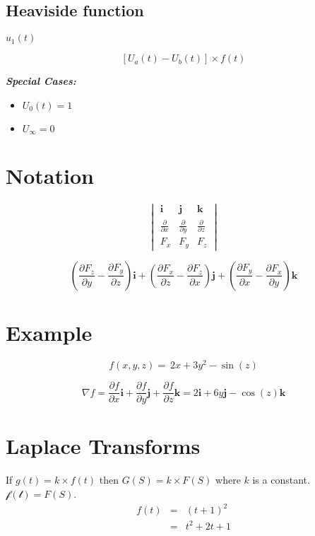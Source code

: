 \documentclass[12pt, a4paper]{article}
\begin{document}
\subsection*{Heaviside function}
$u_1(t)$


\[ \left[U_a(t)  - U_b(t) \right] \times f(t) \]

\textbf{\emph{Special Cases:}}
\begin{itemize}
\item $U_0(t) = 1$
\item $U_{\infty} = 0$
\end{itemize}

\section{Notation}
\[ \begin{vmatrix} \mathbf{i} & \mathbf{j} & \mathbf{k} \\
{\frac{\partial}{\partial x}} & {\frac{\partial}{\partial y}} & {\frac{\partial}{\partial z}} \\
 F_x & F_y & F_z \end{vmatrix}\]

\[\left(\frac{\partial F_z}{\partial y}  - \frac{\partial F_y}{\partial z}\right) \mathbf{i} + \left(\frac{\partial F_x}{\partial z} - \frac{\partial F_z}{\partial x}\right) \mathbf{j} + \left(\frac{\partial F_y}{\partial x} - \frac{\partial F_x}{\partial y}\right) \mathbf{k}\]

\section{Example}
\[f(x,y,z)= \ 2x+3y^2-\sin(z)\]

\[ \nabla f=
\frac{\partial f}{\partial x} \mathbf{i} +
\frac{\partial f}{\partial y} \mathbf{j} +
\frac{\partial f}{\partial z} \mathbf{k}
 = 2\mathbf{i}+ 6y\mathbf{j} -\cos(z)\mathbf{k}\]



\section{Laplace Transforms }
If $g(t)=k \times f(t)$ then $G(S) = k \times F(S)$ where $k$ is a
constant. $\mathcal{f(t)}=F(S)$.
\begin{eqnarray}
f(t) &=& (t+1)^2\\
&=& t^2 +2t +1 \nonumber
\end{eqnarray}
\end{document}
